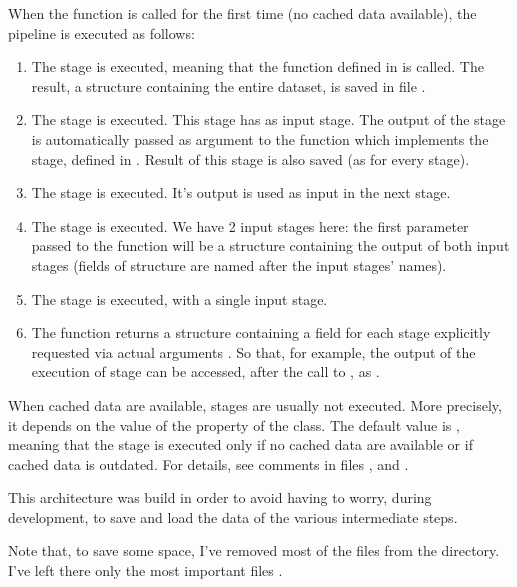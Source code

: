 When the  function is called for the first time (no cached data
available), the pipeline is executed as follows:
\begin{enumerate}
	\item The  stage is executed, meaning that the
		function defined in  is called.
		The result, a structure containing the entire dataset, is saved
		in file .
	\item The  stage is executed. This stage has
		 as input stage. The output of the
		 stage is automatically passed as argument to
		the function which implements the  stage,
		defined in . Result of this
		stage is also saved (as for every stage).
	\item The  stage is executed. It's output is used as
		input in the next stage.
	\item The  stage is executed. We have 2 input
		stages here: the first parameter passed to the function will be
		a structure containing the output of both input stages (fields
		of structure are named after the input stages' names).
	\item The  stage is executed, with a single input
		stage.
	\item The  function returns a structure containing a
		field for each stage explicitly requested via actual arguments
		. So
		that, for example, the output of the execution of stage
		 can be accessed, after the call to
		, as .
\end{enumerate}

When cached data are available, stages are usually not executed. More
precisely, it depends on the value of the  property of the
 class. The default value is , meaning that the
stage is executed only if no cached data are available or if cached data is
outdated. For details, see comments in files , 
and .

This architecture was build in order to avoid having to worry, during
development, to save and load the data of the various intermediate steps.

Note that, to save some space, I've removed most of the files from the
 directory. I've left there only the most important files
.
